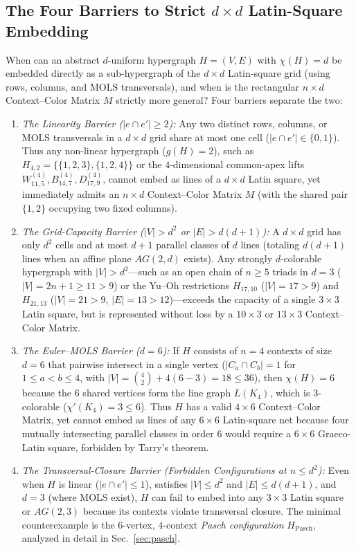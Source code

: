 \documentclass[aps,pra,reprint,superscriptaddress,longbibliography,nofootinbib,floatfix,10pt]{revtex4-2}
\theoremstyle{definition}\newtheorem{definition}[theorem]{Definition}
\theoremstyle{remark}\newtheorem{remark}[theorem]{Remark}
\begin{document}
\subsection{The Four Barriers to Strict \texorpdfstring{$d\times d$}{d x d} Latin-Square Embedding}\label{sec:barriers}

When can an abstract $d$-uniform hypergraph $H=(V,E)$ with $\chi(H)=d$ be embedded directly as a sub-hypergraph of the $d\times d$ Latin-square grid (using rows, columns, and MOLS transversals), and when is the rectangular $n\times d$ Context--Color Matrix $M$ strictly more general? Four barriers separate the two:

\begin{enumerate}
\item \emph{The Linearity Barrier ($|e\cap e'|\ge 2$):} Any two distinct rows, columns, or MOLS transversals in a $d\times d$ grid share at most one cell ($|e\cap e'|\in\{0,1\}$). Thus any non-linear hypergraph ($g(H)=2$), such as $H_{4,2}=\{\{1,2,3\},\{1,2,4\}\}$ or the $4$-dimensional common-apex lifts $W_{11,5}^{(4)},B_{14,7}^{(4)},D_{17,9}^{(4)}$, cannot embed as lines of a $d\times d$ Latin square, yet immediately admits an $n\times d$ Context--Color Matrix $M$ (with the shared pair $\{1,2\}$ occupying two fixed columns).
\item \emph{The Grid-Capacity Barrier ($|V|>d^2$ or $|E|>d(d+1)$):} A $d\times d$ grid has only $d^2$ cells and at most $d+1$ parallel classes of $d$ lines (totaling $d(d+1)$ lines when an affine plane $AG(2,d)$ exists). Any strongly $d$-colorable hypergraph with $|V|>d^2$—such as an open chain of $n\ge 5$ triads in $d=3$ ($|V|=2n+1\ge 11>9$) or the Yu--Oh restrictions $H_{17,10}$ ($|V|=17>9$) and $H_{21,13}$ ($|V|=21>9$, $|E|=13>12$)—exceeds the capacity of a single $3\times 3$ Latin square, but is represented without loss by a $10\times 3$ or $13\times 3$ Context--Color Matrix.
\item \emph{The Euler--MOLS Barrier ($d=6$):} If $H$ consists of $n=4$ contexts of size $d=6$ that pairwise intersect in a single vertex ($|C_a\cap C_b|=1$ for $1\le a<b\le 4$, with $|V|=\binom{4}{2}+4(6-3)=18\le 36$), then $\chi(H)=6$ because the $6$ shared vertices form the line graph $L(K_4)$, which is $3$-colorable ($\chi'(K_4)=3\le 6$). Thus $H$ has a valid $4\times 6$ Context--Color Matrix, yet cannot embed as lines of any $6\times 6$ Latin-square net because four mutually intersecting parallel classes in order $6$ would require a $6\times 6$ Graeco-Latin square, forbidden by Tarry's theorem.
\item \emph{The Transversal-Closure Barrier (Forbidden Configurations at $n\le d^2$):} Even when $H$ is linear ($|e\cap e'|\le 1$), satisfies $|V|\le d^2$ and $|E|\le d(d+1)$, and $d=3$ (where MOLS exist), $H$ can fail to embed into any $3\times 3$ Latin square or $AG(2,3)$ because its contexts violate transversal closure. The minimal counterexample is the $6$-vertex, $4$-context \emph{Pasch configuration} $H_{\mathrm{Pasch}}$, analyzed in detail in Sec.~\ref{sec:pasch}.
\end{enumerate}
\end{document}
